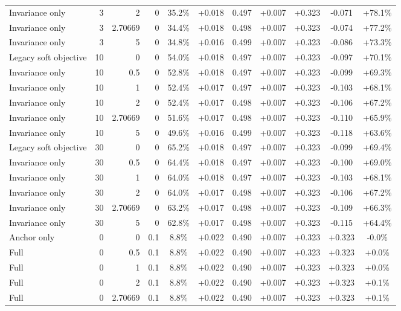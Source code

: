 \begin{table}[htbp]
\begin{tabular}{lrrrccccccc}
Invariance only & 3 & 2 & 0 & 35.2\% & +0.018 & 0.497 & +0.007 & +0.323 & -0.071 & +78.1\% \\
Invariance only & 3 & 2.70669 & 0 & 34.4\% & +0.018 & 0.498 & +0.007 & +0.323 & -0.074 & +77.2\% \\
Invariance only & 3 & 5 & 0 & 34.8\% & +0.016 & 0.499 & +0.007 & +0.323 & -0.086 & +73.3\% \\
Legacy soft objective & 10 & 0 & 0 & 54.0\% & +0.018 & 0.497 & +0.007 & +0.323 & -0.097 & +70.1\% \\
Invariance only & 10 & 0.5 & 0 & 52.8\% & +0.018 & 0.497 & +0.007 & +0.323 & -0.099 & +69.3\% \\
Invariance only & 10 & 1 & 0 & 52.4\% & +0.017 & 0.497 & +0.007 & +0.323 & -0.103 & +68.1\% \\
Invariance only & 10 & 2 & 0 & 52.4\% & +0.017 & 0.498 & +0.007 & +0.323 & -0.106 & +67.2\% \\
Invariance only & 10 & 2.70669 & 0 & 51.6\% & +0.017 & 0.498 & +0.007 & +0.323 & -0.110 & +65.9\% \\
Invariance only & 10 & 5 & 0 & 49.6\% & +0.016 & 0.499 & +0.007 & +0.323 & -0.118 & +63.6\% \\
Legacy soft objective & 30 & 0 & 0 & 65.2\% & +0.018 & 0.497 & +0.007 & +0.323 & -0.099 & +69.4\% \\
Invariance only & 30 & 0.5 & 0 & 64.4\% & +0.018 & 0.497 & +0.007 & +0.323 & -0.100 & +69.0\% \\
Invariance only & 30 & 1 & 0 & 64.0\% & +0.018 & 0.497 & +0.007 & +0.323 & -0.103 & +68.1\% \\
Invariance only & 30 & 2 & 0 & 64.0\% & +0.017 & 0.498 & +0.007 & +0.323 & -0.106 & +67.2\% \\
Invariance only & 30 & 2.70669 & 0 & 63.2\% & +0.017 & 0.498 & +0.007 & +0.323 & -0.109 & +66.3\% \\
Invariance only & 30 & 5 & 0 & 62.8\% & +0.017 & 0.498 & +0.007 & +0.323 & -0.115 & +64.4\% \\
Anchor only & 0 & 0 & 0.1 & 8.8\% & +0.022 & 0.490 & +0.007 & +0.323 & +0.323 & -0.0\% \\
Full & 0 & 0.5 & 0.1 & 8.8\% & +0.022 & 0.490 & +0.007 & +0.323 & +0.323 & +0.0\% \\
Full & 0 & 1 & 0.1 & 8.8\% & +0.022 & 0.490 & +0.007 & +0.323 & +0.323 & +0.0\% \\
Full & 0 & 2 & 0.1 & 8.8\% & +0.022 & 0.490 & +0.007 & +0.323 & +0.323 & +0.1\% \\
Full & 0 & 2.70669 & 0.1 & 8.8\% & +0.022 & 0.490 & +0.007 & +0.323 & +0.323 & +0.1\% \\

\end{tabular}
\end{table}
